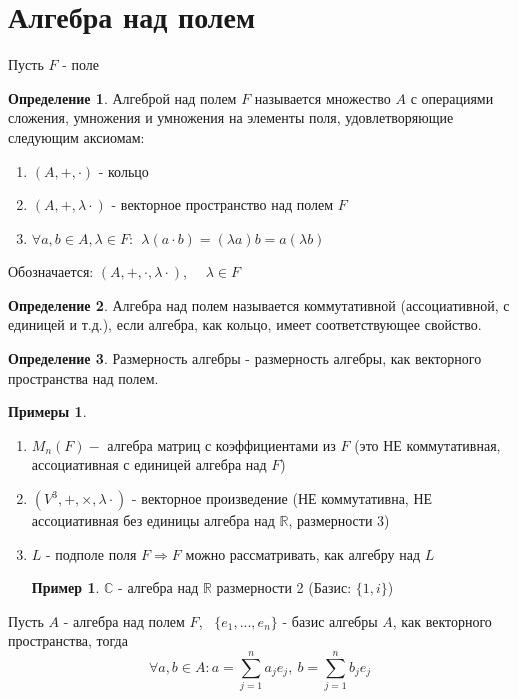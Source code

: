 \documentclass[a4paper, 12pt]{article}
\newcommand{\R}{\mathbb R}
\newcommand\tab[1][.5cm]{\hspace*{#1}}
\theoremstyle{definition}
\newtheorem*{definition}{Определение}
\newtheorem*{example}{Примеры}
\newtheorem*{example1}{Пример}
\begin{document}
  \newpage
  
  \section{Алгебра над полем}
  Пусть $F$ - поле 
  \begin{definition}
    Алгеброй над полем $F$ называется множество $A$ с операциями сложения, умножения и умножения на элементы поля, удовлетворяющие следующим аксиомам:
    \begin{enumerate}
      \item $(A, +, \cdot)$ - кольцо
      \item $(A, +, \lambda \cdot)$ - векторное пространство над полем $F$
      \item $\forall a, b \in A, \lambda\in F: \ \ \lambda(a \cdot b) = (\lambda a)b = a(\lambda b)$    
    \end{enumerate}
    Обозначается: $(A, +, \cdot, \lambda \cdot)$, \ \ $\lambda\in F$ 
  \end{definition}
  \begin{definition}
    Алгебра над полем называется коммутативной (ассоциативной, с единицей и т.д.), если алгебра, как кольцо, имеет соответствующее свойство.
  \end{definition}
  \begin{definition}
    Размерность алгебры - размерность алгебры, как векторного пространства над полем.
  \end{definition} 
  \begin{example}\tab
    \begin{enumerate}
      \item $M_n(F) -$ алгебра матриц с коэффициентами из $F$ (это НЕ коммутативная, ассоциативная с единицей алгебра над $F$)
      \item $(V^3, +, \times, \lambda \cdot)$ - векторное произведение (НЕ коммутативна, НЕ ассоциативная без единицы алгебра над $\R$, размерности 3)
      \item $L$ - подполе поля $F \Longrightarrow F$ можно рассматривать, как алгебру над $L$  
      \begin{example1}
        $\mathbb{C}$ - алгебра над $\R$ размерности 2 (Базис: $\{1, i\}$) 
      \end{example1}
    \end{enumerate}
  \end{example}
  Пусть $A$ - алгебра над полем $F$, \ $\{e_1,...,e_n\}$ - базис алгебры $A$, как векторного пространства, тогда $$\forall a, b \in A: a = \sum \limits_{j=1}^na_je_j, \ b = \sum \limits_{j=1}^nb_je_j$$ 
\end{document}
